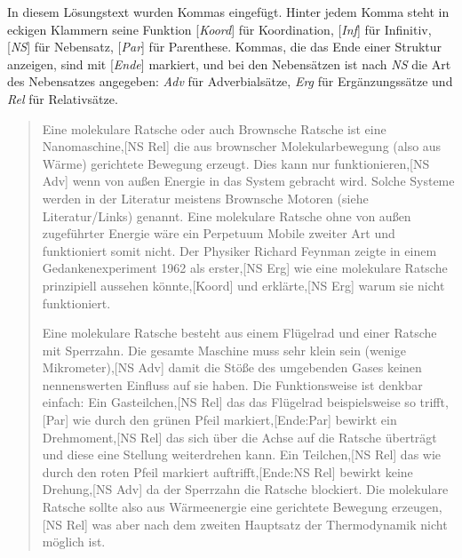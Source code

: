 \label{sol:morphosyntaktischeschreibprinzipien02} In diesem Lösungstext wurden Kommas eingefügt.
Hinter jedem Komma steht in eckigen Klammern seine Funktion [\textit{Koord}] für Koordination, [\textit{Inf}] für Infinitiv, [\textit{NS}] für Nebensatz, [\textit{Par}] für Parenthese.
Kommas, die das Ende einer Struktur anzeigen, sind mit [\textit{Ende}] markiert, und bei den Nebensätzen ist nach \textit{NS} die Art des Nebensatzes angegeben: \textit{Adv} für Adverbialsätze, \textit{Erg} für Ergänzungssätze und \textit{Rel} für Relativsätze.

\vspace{0.5cm}

\begin{sloppypar}
\begin{quote}
Eine molekulare Ratsche oder auch Brownsche Ratsche ist eine Nanomaschine,[NS Rel] die aus brownscher Molekularbewegung (also aus Wärme) gerichtete Bewegung erzeugt.
Dies kann nur funktionieren,[NS Adv] wenn von außen Energie in das System gebracht wird.
Solche Systeme werden in der Literatur meistens Brownsche Motoren (siehe Literatur/Links) genannt.
Eine molekulare Ratsche ohne von außen zugeführter Energie wäre ein Perpetuum Mobile zweiter Art und funktioniert somit nicht.
Der Physiker Richard Feynman zeigte in einem Gedankenexperiment 1962 als erster,[NS Erg] wie eine molekulare Ratsche prinzipiell aussehen könnte,[Koord] und erklärte,[NS Erg] warum sie nicht funktioniert.

Eine molekulare Ratsche besteht aus einem Flügelrad und einer Ratsche mit Sperrzahn.
Die gesamte Maschine muss sehr klein sein (wenige Mikrometer),[NS Adv] damit die Stöße des umgebenden Gases keinen nennenswerten Einfluss auf sie haben.
Die Funktionsweise ist denkbar einfach:
Ein Gasteilchen,[NS Rel] das das Flügelrad beispielsweise so trifft,[Par] wie durch den grünen Pfeil markiert,[Ende:Par] bewirkt ein Drehmoment,[NS Rel] das sich über die Achse auf die Ratsche überträgt und diese eine Stellung weiterdrehen kann.
Ein Teilchen,[NS Rel] das wie durch den roten Pfeil markiert auftrifft,[Ende:NS Rel] bewirkt keine Drehung,[NS Adv] da der Sperrzahn die Ratsche blockiert.
Die molekulare Ratsche sollte also aus Wärmeenergie eine gerichtete Bewegung erzeugen,[NS Rel] was aber nach dem zweiten Hauptsatz der Thermodynamik nicht möglich ist.


\end{quote}
\end{sloppypar}
